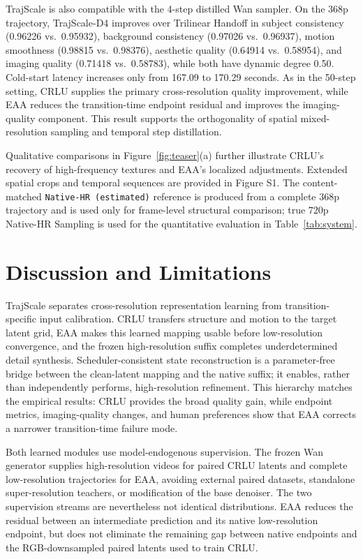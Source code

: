 TrajScale is also compatible with the 4-step distilled Wan sampler. On the
\(368\text{p}\) trajectory, TrajScale-D4 improves over Trilinear Handoff in
subject consistency (0.96226 vs.\ 0.95932), background consistency (0.97026
vs.\ 0.96937), motion smoothness (0.98815 vs.\ 0.98376), aesthetic quality
(0.64914 vs.\ 0.58954), and imaging quality (0.71418 vs.\ 0.58783), while both
have dynamic degree 0.50. Cold-start latency increases only from 167.09 to
170.29 seconds. As in the 50-step setting, CRLU supplies the
primary cross-resolution quality improvement, while EAA reduces the
transition-time endpoint residual and improves the imaging-quality component.
This result supports the orthogonality of spatial mixed-resolution sampling and
temporal step distillation.

Qualitative comparisons in Figure~\ref{fig:teaser}(a) further illustrate
CRLU's recovery of high-frequency textures and EAA's localized adjustments.
Extended spatial crops and temporal sequences are provided in Figure S1. The
content-matched \texttt{Native-HR (estimated)} reference is produced from a
complete \(368\text{p}\) trajectory and is used only for frame-level
structural comparison; true \(720\text{p}\) Native-HR Sampling is used for
the quantitative evaluation in Table~\ref{tab:system}.

\section{Discussion and Limitations}

TrajScale separates cross-resolution representation learning from
transition-specific input calibration. CRLU transfers structure and motion to
the target latent grid, EAA makes this learned mapping usable before
low-resolution convergence, and the frozen high-resolution suffix completes
underdetermined detail synthesis. Scheduler-consistent state reconstruction is
a parameter-free bridge between the clean-latent mapping and the native suffix;
it enables, rather than independently performs, high-resolution refinement.
This hierarchy matches the empirical results: CRLU provides the broad quality
gain, while endpoint metrics, imaging-quality changes, and human preferences
show that EAA corrects a narrower transition-time failure mode.

Both learned modules use model-endogenous supervision. The frozen Wan generator
supplies high-resolution videos for paired CRLU latents and complete
low-resolution trajectories for EAA, avoiding external paired datasets,
standalone super-resolution teachers, or modification of the base denoiser.
The two supervision streams are nevertheless not identical distributions. EAA
reduces the residual between an intermediate prediction and its native
low-resolution endpoint, but does not eliminate the remaining gap between
native endpoints and the RGB-downsampled paired latents used to train CRLU.

